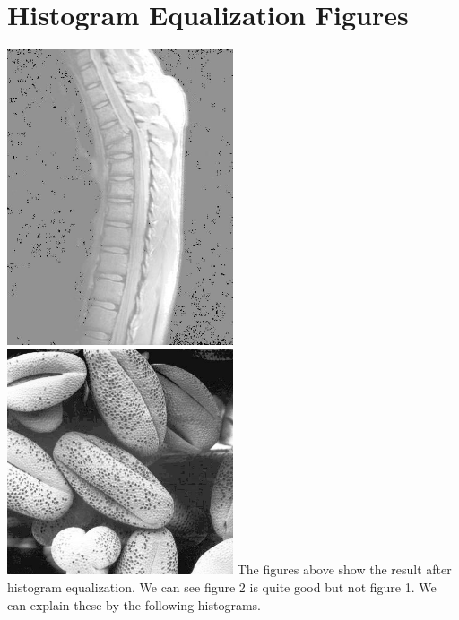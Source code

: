 \documentclass{article}
\begin{document}
\section{Histogram Equalization Figures}
\includegraphics[width=0.5\textwidth]{../data/new_Fig1.jpg}
\includegraphics[width=0.5\textwidth]{../data/new_Fig2.jpg}
The figures above show the result after histogram equalization. We can see figure 2 is quite good but not figure 1. We can explain these by the following histograms.
\end{document}
